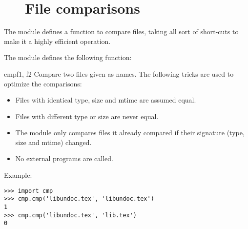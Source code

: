 \section{ ---
         File comparisons}



The  module defines a function to compare files, taking all
sort of short-cuts to make it a highly efficient operation.

The  module defines the following function:

\begin{funcdesc}{cmp}{f1, f2}
Compare two files given as names. The following tricks are used to
optimize the comparisons:

\begin{itemize}
        \item Files with identical type, size and mtime are assumed equal.
        \item Files with different type or size are never equal.
        \item The module only compares files it already compared if their
        signature (type, size and mtime) changed.
        \item No external programs are called.
\end{itemize}
\end{funcdesc}

Example:

\begin{verbatim}
>>> import cmp
>>> cmp.cmp('libundoc.tex', 'libundoc.tex')
1
>>> cmp.cmp('libundoc.tex', 'lib.tex')
0
\end{verbatim}
